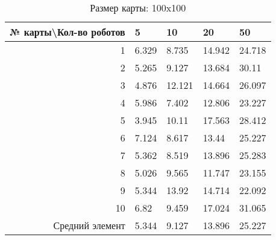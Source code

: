 \begin{table}[H]
\centering
\begin{tabular}{|r|l|l|l|l|}
\hline
№ карты\textbackslash Кол-во роботов & \textbf{5} & \textbf{10} & \textbf{20} & \textbf{50}\\ \hline
1 & 6.329 & 8.735 & 14.942 & 24.718\\ \hline
2 & 5.265 & 9.127 & 13.684 & 30.11\\ \hline
3 & 4.876 & 12.121 & 14.664 & 26.097\\ \hline
4 & 5.986 & 7.402 & 12.806 & 23.227\\ \hline
5 & 3.945 & 10.11 & 17.563 & 28.412\\ \hline
6 & 7.124 & 8.617 & 13.44 & 25.227\\ \hline
7 & 5.362 & 8.519 & 13.896 & 25.283\\ \hline
8 & 5.026 & 9.565 & 11.747 & 23.155\\ \hline
9 & 5.344 & 13.92 & 14.714 & 22.092\\ \hline
10 & 6.82 & 9.459 & 17.024 & 31.065\\ \hline
Средний элемент & 5.344 & 9.127 & 13.896 & 25.227\\ \hline
\end{tabular}
\caption*{Размер карты: 100x100}
\end{table}
